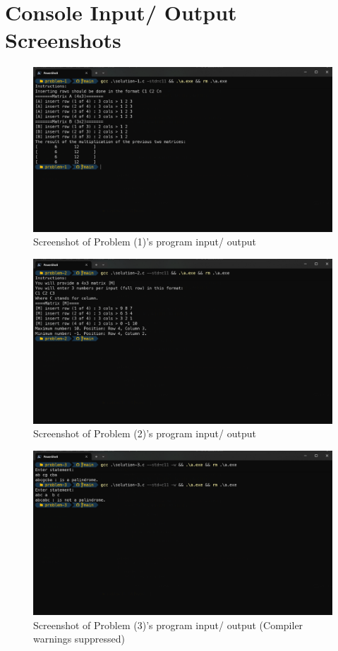 \documentclass[a4paper,11pt]{article}
\theoremstyle{mytheor}
\theoremstyle{mytheor}
\begin{document}
\section{Console Input/ Output Screenshots}
\begin{figure}[!h]
    \centering
    \includegraphics[width=\linewidth]{assets/prob-1.png}
    \caption{Screenshot of Problem (1)'s program input/ output}
\end{figure}
\begin{figure}[!h]
    \centering
    \includegraphics[width=\linewidth]{assets/prob-2.png}
    \caption{Screenshot of Problem (2)'s program input/ output}
\end{figure}
\newpage
\begin{figure}[!h]
    \centering
    \includegraphics[width=\linewidth]{assets/prob-3.png}
    \caption{Screenshot of Problem (3)'s program input/ output (Compiler warnings suppressed)}
\end{figure}
\end{document}
